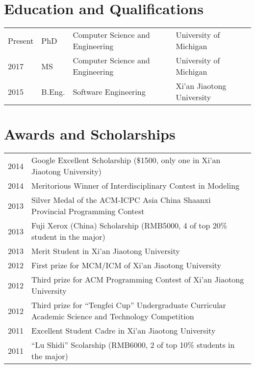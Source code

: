 \documentclass[a4paper,11pt]{article}
\begin{document}
\maketitle

\section{Education and Qualifications}


\begin{tabular}{llll}
    Present        & PhD  & Computer Science and Engineering & University of Michigan \\
    2017           & MS   & Computer Science and Engineering & University of Michigan \\
    2015           & B.Eng. & Software Engineering & Xi'an Jiaotong University
\end{tabular}

\begin{publications}
\end{publications}

\section{Awards and Scholarships}

\begin{tabular}{lp{15cm}}
    2014 & Google Excellent Scholarship (\$1500, only one in Xi'an Jiaotong University) \\
    2014 & Meritorious Winner of Interdisciplinary Contest in Modeling \\
    2013 & Silver Medal of the ACM-ICPC Asia China
            \newline Shaanxi Provincial Programming Contest \\
    2013 & Fuji Xerox (China) Scholarship (RMB5000, 4 of top 20\% student in the major) \\
    2013 & Merit Student in Xi'an Jiaotong University \\
    2012 & First prize for MCM/ICM of Xi'an Jiaotong University \\
    2012 & Third prize for ACM Programming Contest of Xi'an Jiaotong University \\
    2012 & Third prize for ``Tengfei Cup'' Undergraduate
            \newline Curricular Academic Science and Technology Competition \\
    2011 & Excellent Student Cadre in Xi'an Jiaotong University  \\
    2011 & ``Lu Shidi'' Scolarship (RMB6000, 2 of top 10\% students in the major)
\end{tabular}
\end{document}
